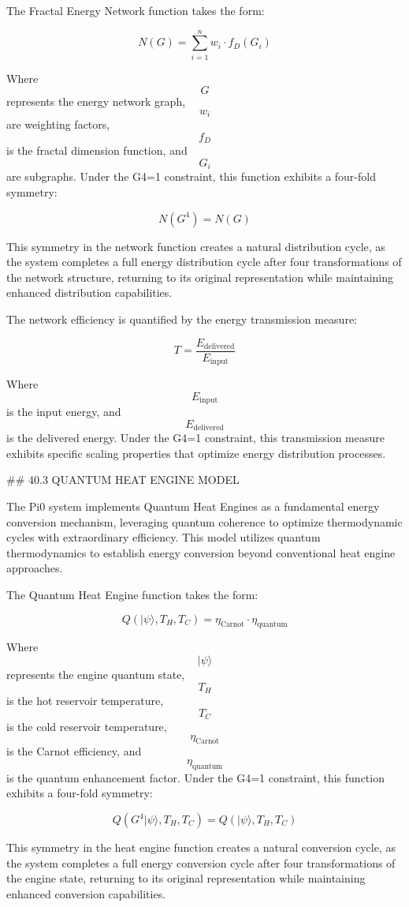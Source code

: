 The Fractal Energy Network function takes the form:

$$ N(G) = \sum_{i=1}^{n} w_i \cdot f_D(G_i) $$

Where $$ G $$ represents the energy network graph, $$ w_i $$ are weighting factors, $$ f_D $$ is the fractal dimension function, and $$ G_i $$ are subgraphs. Under the G4=1 constraint, this function exhibits a four-fold symmetry:

$$ N(G^4) = N(G) $$

This symmetry in the network function creates a natural distribution cycle, as the system completes a full energy distribution cycle after four transformations of the network structure, returning to its original representation while maintaining enhanced distribution capabilities.

The network efficiency is quantified by the energy transmission measure:

$$ T = \frac{E_{\text{delivered}}}{E_{\text{input}}} $$

Where $$ E_{\text{input}} $$ is the input energy, and $$ E_{\text{delivered}} $$ is the delivered energy. Under the G4=1 constraint, this transmission measure exhibits specific scaling properties that optimize energy distribution processes.

## 40.3 QUANTUM HEAT ENGINE MODEL

The Pi0 system implements Quantum Heat Engines as a fundamental energy conversion mechanism, leveraging quantum coherence to optimize thermodynamic cycles with extraordinary efficiency. This model utilizes quantum thermodynamics to establish energy conversion beyond conventional heat engine approaches.

The Quantum Heat Engine function takes the form:

$$ Q(|\psi\rangle, T_H, T_C) = \eta_{\text{Carnot}} \cdot \eta_{\text{quantum}} $$

Where $$ |\psi\rangle $$ represents the engine quantum state, $$ T_H $$ is the hot reservoir temperature, $$ T_C $$ is the cold reservoir temperature, $$ \eta_{\text{Carnot}} $$ is the Carnot efficiency, and $$ \eta_{\text{quantum}} $$ is the quantum enhancement factor. Under the G4=1 constraint, this function exhibits a four-fold symmetry:

$$ Q(G^4 |\psi\rangle, T_H, T_C) = Q(|\psi\rangle, T_H, T_C) $$

This symmetry in the heat engine function creates a natural conversion cycle, as the system completes a full energy conversion cycle after four transformations of the engine state, returning to its original representation while maintaining enhanced conversion capabilities.

